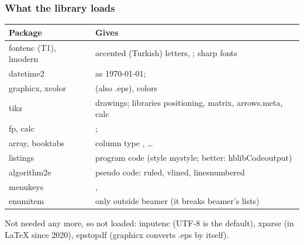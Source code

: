 \documentclass[aspectratio=169,10pt,compress]{beamer}
\begin{document}
\begin{frame}[t,fragile] \frametitle{What the library loads}

\begin{table}
		\scriptsize
		\begin{tabular}{@{}L{0.22\textwidth}L{0.70\textwidth}@{}}
			\toprule
			\textbf{Package} & \textbf{Gives} \\
			\midrule
			fontenc (T1), lmodern       & accented (Turkish) letters, \hCode{<} \hCode{>} \hCode{|}; sharp fonts \\
			datetime2                   &  as \today;  \\
			graphicx, xcolor            &  (also .eps), colors \\
			tikz                        & drawings; libraries positioning, matrix, arrows.meta, calc \\
			fp, calc                    & ;  \\
			array, booktabs             & column type ,  \dots \\
			listings                    & program code (style mystyle; better: hblibCodeoutput) \\
			algorithm2e                 & pseudo code: ruled, vlined, linesnumbered \\
			menukeys                    & ,  \\
			enumitem                    & only outside beamer (it breaks beamer's lists) \\
			\bottomrule
		\end{tabular}
\end{table}%

	\small Not needed any more, so not loaded: inputenc (UTF-8 is the default), xparse (in LaTeX since 2020),
	epstopdf (graphicx converts .eps by itself).
\end{frame}
\end{document}
